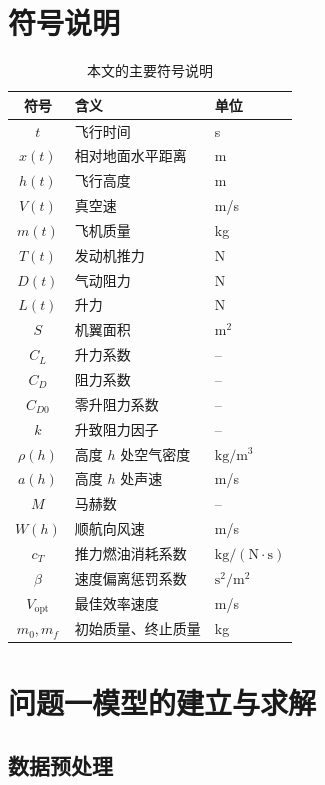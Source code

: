 \documentclass[withoutpreface,bwprint]{cumcmthesis}
\begin{document}
\section{符号说明}

\begin{table}[htpb]
\centering
\caption{本文的主要符号说明}\label{tab:symbols}
\begin{tabular}{cll}\toprule
符号 & 含义 & 单位 \\
\midrule
$t$ & 飞行时间 & s \\
$x(t)$ & 相对地面水平距离 & m \\
$h(t)$ & 飞行高度 & m \\
$V(t)$ & 真空速 & m/s \\
$m(t)$ & 飞机质量 & kg \\
$T(t)$ & 发动机推力 & N \\
$D(t)$ & 气动阻力 & N \\
$L(t)$ & 升力 & N \\
$S$ & 机翼面积 & $\mathrm{m^2}$ \\
$C_L$ & 升力系数 & -- \\
$C_D$ & 阻力系数 & -- \\
$C_{D0}$ & 零升阻力系数 & -- \\
$k$ & 升致阻力因子 & -- \\
$\rho(h)$ & 高度 $h$ 处空气密度 & $\mathrm{kg/m^3}$ \\
$a(h)$ & 高度 $h$ 处声速 & m/s \\
$M$ & 马赫数 & -- \\
$W(h)$ & 顺航向风速 & m/s \\
$c_T$ & 推力燃油消耗系数 & $\mathrm{kg/(N\cdot s)}$ \\
$\beta$ & 速度偏离惩罚系数 & $\mathrm{s^2/m^2}$ \\
$V_{\mathrm{opt}}$ & 最佳效率速度 & m/s \\
$m_0,m_f$ & 初始质量、终止质量 & kg \\
\bottomrule
\end{tabular}
\end{table}

\section{问题一模型的建立与求解}

\subsection{数据预处理}
\end{document}
